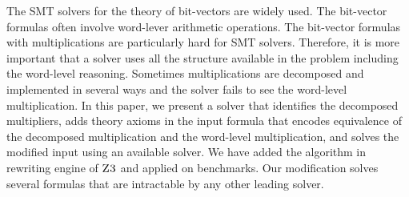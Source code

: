 %
The SMT solvers for the theory of bit-vectors are widely used.
%
The bit-vector formulas often involve word-lever arithmetic
operations.
%
The bit-vector formulas with multiplications
are particularly hard for SMT solvers.
%
Therefore, it is more important that a solver uses all 
the structure available in the problem including the
word-level reasoning.
%
Sometimes multiplications are decomposed and implemented in several
ways and the solver fails to see the word-level multiplication. 
%
In this paper, we present a solver that identifies the decomposed
multipliers, adds theory axioms in the input formula that encodes
equivalence of the decomposed multiplication and the word-level
multiplication, and solves the modified input using an available
solver.
%
We have added the algorithm in rewriting engine of $\textsc{Z3}$
and applied on benchmarks.
%
Our modification solves several formulas that are
intractable by any other leading solver.
%


